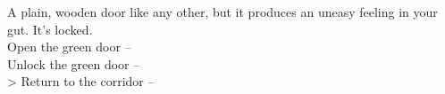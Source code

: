 A plain, wooden door like any other, but it produces an uneasy feeling in your gut. It’s locked.\\

 Open the green door -- \\
 Unlock the green door -- \\
> Return to the corridor -- 